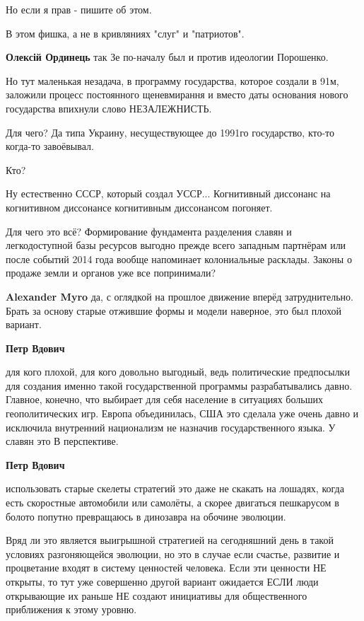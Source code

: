 \begin{itemize}
\begin{itemize}
Но если я прав - пишите об этом.

В этом фишка, а не в кривляниях "слуг" и "патриотов".

\textbf{Олексій Ординець} так Зе по-началу был и против идеологии Порошенко.
\end{itemize} %


Но тут маленькая незадача, в программу государства, которое создали в 91м,
заложили процесс постоянного щеневмирання и вместо даты основания нового
государства впихнули слово НЕЗАЛЕЖНИСТЬ.

Для чего? Да типа Украину, несуществующее до 1991го государство, кто-то
когда-то завоёвывал.

Кто?

Ну естественно СССР, который создал УССР... Когнитивный диссонанс на
когнитивном диссонансе когнитивным диссонансом погоняет.

Для чего это всё? Формирование фундамента разделения славян и легкодоступной
базы ресурсов выгодно прежде всего западным партнёрам или после событий 2014
года вообще напоминает колониальные расклады. Законы о продаже земли и органов
уже все попринимали?

\begin{itemize} %
\textbf{Alexander Myro} да, с оглядкой на прошлое движение вперёд затруднительно.
Брать за основу старые отжившие формы и модели наверное, это был плохой вариант.

\textbf{Петр Вдович} 

для кого плохой, для кого довольно выгодный, ведь политические предпосылки для
создания именно такой государственной программы разрабатывались давно.
Главное, конечно, что выбирает для себя население в ситуациях больших
геополитических игр. Европа объединилась, США это сделала уже очень давно и
исключила внутренний национализм не назначив государственного языка. У славян
это В перспективе.

\textbf{Петр Вдович} 

использовать старые скелеты стратегий это даже не скакать на лошадях, когда
есть скоростные автомобили или самолёты, а скорее двигаться пешкарусом в болото
попутно превращаюсь в динозавра на обочине эволюции.

Вряд ли это является выигрышной стратегией на сегодняшний день в такой условиях
разгоняющейся эволюции, но это в случае если счастье, развитие и процветание
входят в систему ценностей человека. Если эти ценности НЕ открыты, то тут уже
совершенно другой вариант ожидается ЕСЛИ люди открывающие их раньше НЕ создают
инициативы для общественного приближения к этому уровню.


\end{itemize}
\end{itemize}
